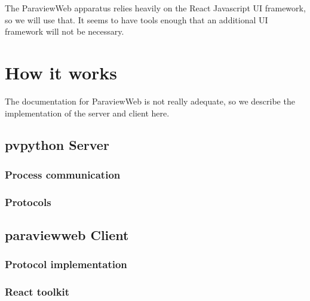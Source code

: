 \documentclass[11pt]{article}
\begin{document}
The ParaviewWeb apparatus relies heavily on the React Javascript UI
framework, so we will use that.  It seems to have tools enough that an
additional UI framework will not be necessary.

\section{How it works}


The documentation for ParaviewWeb is not really adequate, so we
describe the implementation of the server and client here.


\subsection{pvpython Server}

\subsubsection{Process communication}

\subsubsection{Protocols}


\subsection{paraviewweb Client}

\subsubsection{Protocol implementation}

\subsubsection{React toolkit}
\end{document}

